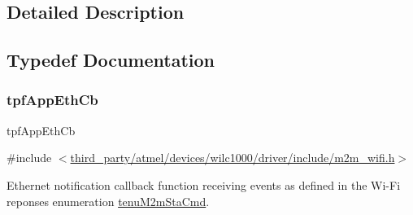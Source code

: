 \subsection{Detailed Description}


\subsection{Typedef Documentation}
\mbox{\label{group__WlanEnums_ga9dda38bbac67906396ad1b1e0419502d}} 
\subsubsection{\texorpdfstring{tpf\+App\+Eth\+Cb}{tpfAppEthCb}}
{\footnotesize\ttfamily tpf\+App\+Eth\+Cb}



{\ttfamily \#include $<$\hyperlink{m2m__wifi_8h}{third\+\_\+party/atmel/devices/wilc1000/driver/include/m2m\+\_\+wifi.\+h}$>$}



Ethernet notification callback function receiving events as defined in the Wi-\/\+Fi reponses enumeration \hyperlink{group__WlanEnums_ga064de09dec1d5e88ed8d075fa40f57de}{tenu\+M2m\+Sta\+Cmd}. 



